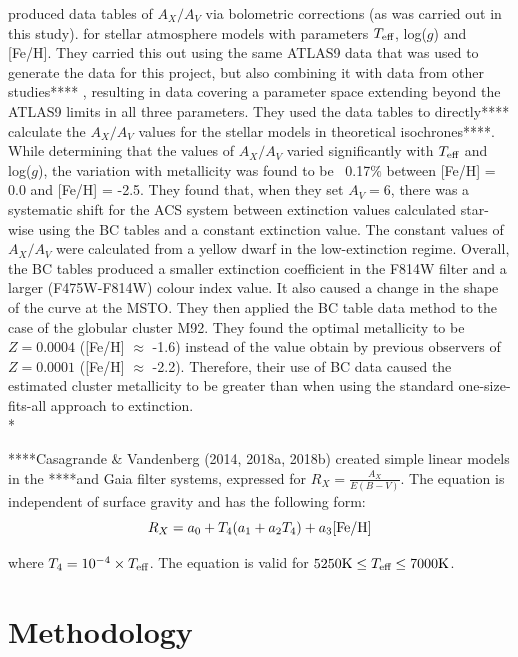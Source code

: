 \documentclass[12pt, a4paper]{report}
\begin{document}
\cite{2008PASP..120..583G} produced data tables of $A_{X}/A_{V}$ via bolometric corrections (as was carried out in this study). for stellar atmosphere models with parameters $T_{\textnormal{eff}}$, log($g$) and [Fe/H]. They carried this out using the same ATLAS9 data \cite{2004astro.ph..5087C} that was used to generate the data for this project, but also combining it with data from other studies**** \cite{2002A&A...391..195G}, resulting in data covering a parameter space extending beyond the ATLAS9 limits in all three parameters. They used the data tables to directly**** calculate the $A_{X}/A_{V}$ values for the stellar models in theoretical isochrones****. While determining that the values of $A_{X}/A_{V}$ varied significantly with $T_{\textnormal{eff}}$ and log($g$), the variation with metallicity was found to be ~0.17$\%$ between [Fe/H] = 0.0 and [Fe/H] = -2.5. They found that, when they set $A_{V} = 6$, there was a systematic shift for the ACS system between extinction values calculated star-wise using the BC tables and a constant extinction value. The constant values of $A_{X}/A_{V}$ were calculated from a yellow dwarf in the low-extinction regime. Overall, the BC tables produced a smaller extinction coefficient in the F814W filter and a larger (F475W-F814W) colour index value. It also caused a change in the shape of the curve at the MSTO. They then applied the BC table data method to the case of the globular cluster M92. They found the optimal metallicity to be $Z = 0.0004$ ([Fe/H] $\approx$ -1.6) instead of the value obtain by previous observers of $Z = 0.0001$ ([Fe/H] $\approx$ -2.2). Therefore, their use of BC data caused the estimated cluster metallicity to be greater than when using the standard one-size-fits-all approach to extinction. \\*

****Casagrande \& Vandenberg (2014, 2018a, 2018b) created simple linear models in the ****and Gaia filter systems, expressed for $R_{X}  = \frac{A_{X}}{E(B-V)}$. The equation is independent of surface gravity and has the following form:
\begin{equation}
R_{X}  = a_{0} + T_{4}(a_{1} + a_{2}T_{4}) + a_{3}\textnormal{[Fe/H]}
\label{casagrande_ext_fit}
\end{equation}

where $T_{4} = 10^{-4} \times T_{\textnormal{eff}}$. The equation is valid for $5250\textnormal{K} \leq T_{\textnormal{eff}} \leq 7000\textnormal{K}$.



\chapter{Methodology}
\end{document}
